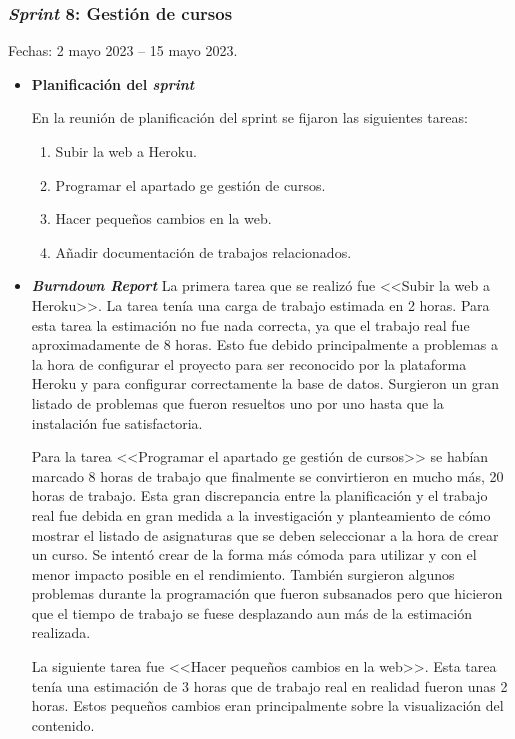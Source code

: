 \subsubsection{\textit{Sprint} 8: Gestión de cursos}
Fechas: 2 mayo 2023 -- 15 mayo 2023.
\begin{itemize}
\item\textbf{Planificación del \textit{sprint}}


En la reunión de planificación del sprint se fijaron las siguientes tareas:
\begin{enumerate}
		\item Subir la web a Heroku.
		\item Programar el apartado ge gestión de cursos.
		\item Hacer pequeños cambios en la web.
		\item Añadir documentación de trabajos relacionados.
\end{enumerate}

\item\textbf{\textit{Burndown Report}}
La primera tarea que se realizó fue <<Subir la web a Heroku>>.
La tarea tenía una carga de trabajo estimada en 2 horas.
Para esta tarea la estimación no fue nada correcta, ya que el trabajo real fue aproximadamente de 8 horas.
Esto fue debido principalmente a problemas a la hora de configurar el proyecto para ser reconocido por la plataforma Heroku y para configurar correctamente la base de datos. 
Surgieron un gran listado de problemas que fueron resueltos uno por uno hasta que la instalación fue satisfactoria.

Para la tarea <<Programar el apartado ge gestión de cursos>> se habían marcado 8 horas de trabajo que finalmente se convirtieron en mucho más, 20 horas de trabajo.
Esta gran discrepancia entre la planificación y el trabajo real fue debida en gran medida a la investigación y planteamiento de cómo mostrar el listado de asignaturas que se deben seleccionar a la hora de crear un curso.
Se intentó crear de la forma más cómoda para utilizar y con el menor impacto posible en el rendimiento.
También surgieron algunos problemas durante la programación que fueron subsanados pero que hicieron que el tiempo de trabajo se fuese desplazando aun más de la estimación realizada.

La siguiente tarea fue <<Hacer pequeños cambios en la web>>.
Esta tarea tenía una estimación de 3 horas que de trabajo real en realidad fueron unas 2 horas. 
Estos pequeños cambios eran principalmente sobre la visualización del contenido.


\end{itemize}
